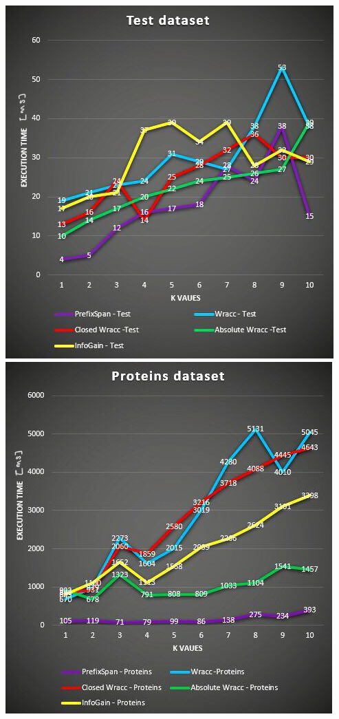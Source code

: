 \documentclass[10pt, a4paper]{article}
\begin{document}
	\begin{multicols}{2}
	\includegraphics[scale=0.5]{tests.jpg}
	\includegraphics[scale=0.5]{proteins.jpg}	
    \end{multicols}
\end{document}
